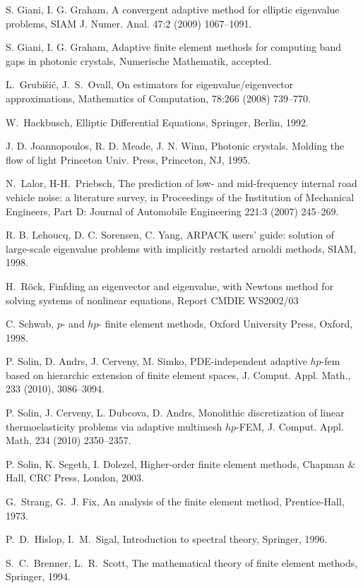 \documentclass[preprint,12pt]{elsarticle}
\begin{document}
\begin{thebibliography}{10}
{\sc S. Giani, I. G. Graham,}
 { A convergent adaptive method for elliptic eigenvalue problems},
{ SIAM J. Numer. Anal.} 47:2 (2009)  1067--1091.

{\sc S. Giani, I. G. Graham,}
{ Adaptive finite element methods for computing band
gaps in photonic crystals},
{Numerische Mathematik}, accepted.

{\sc L.~Grubi\v{s}i\'c, J.~S.~Ovall},
{ On estimators for eigenvalue/eigenvector approximations},
{ Mathematics of Computation}, 78:266 (2008)  739--770.

{\sc W.~Hackbusch,}
 { Elliptic Differential Equations},
 Springer, Berlin, 1992.

{\sc J. D. Joannopoulos, R. D. Meade,  J. N. Winn, }
{ Photonic crystals. Molding the flow of light} 
{Princeton
Univ. Press, Princeton, NJ}, 1995.

{\sc N.~Lalor, H-H.~Priebsch,}
	 { The prediction of low- and mid-frequency internal road vehicle noise: a literature survey},
	{in Proceedings of the Institution of Mechanical Engineers, Part D: Journal of Automobile Engineering} 
	221:3 (2007)  245--269.

{\sc R. B. Lehoucq, D. C. Sorensen, C. Yang, }
{ ARPACK
users' guide: solution of large-scale eigenvalue problems with
implicitly restarted arnoldi methods},  {SIAM, 1998}.

{\sc H.~R\"{o}ck,}
{ Finfding an eigenvector and eigenvalue, with Newtons method for solving systems of nonlinear equations},
{Report CMDIE WS2002/03}

{\sc C. Schwab,}
 { $p$- and $hp$- finite element methods},
{ Oxford University Press}, Oxford, 1998.

{\sc P. Solin, D. Andrs, J. Cerveny, M. Simko,}
{ PDE-independent adaptive $hp$-fem based on hierarchic extension of finite element spaces},
{J. Comput. Appl. Math.}, 233 (2010),  3086--3094.

{\sc P. Solin, J. Cerveny, L. Dubcova, D. Andrs,}
{ Monolithic discretization of linear 
thermoelasticity problems via adaptive multimesh $hp$-FEM}, 
{J. Comput. Appl. Math},
234 (2010)  2350--2357.

{\sc P. Solin, K. Segeth, I. Dolezel,}
{ Higher-order finite element methods},
Chapman \& Hall, CRC Press, London, 2003.

{\sc G.~Strang, G.~J. Fix},
 { An analysis of the finite element method},
 Prentice-Hall, 1973.
 
{\sc P.~D.~Hislop, I.~M.~Sigal},
 { Introduction to spectral theory},
 Springer, 1996.
 
{\sc S.~C.~Brenner, L.~R.~Scott},
 { The mathematical theory of finite element methods},
 Springer, 1994.

\end{thebibliography} 
\end{document}
